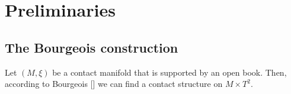 \section*{Preliminaries}
\subsection*{The Bourgeois construction}
Let $(M, \xi)$ be a contact manifold that is supported by an open book.
Then, according to Bourgeois [] we can find a contact structure on $M \times T^2$.
